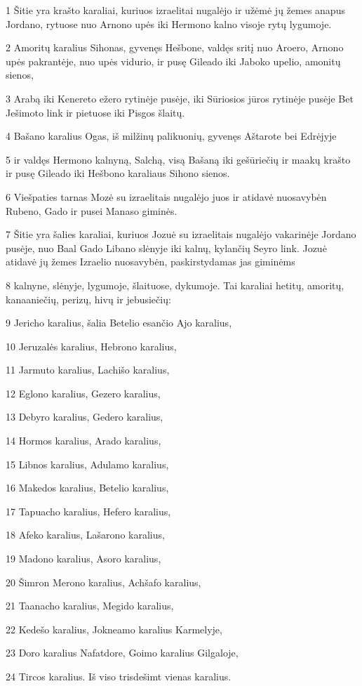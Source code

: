 \par 1 Šitie yra krašto karaliai, kuriuos izraelitai nugalėjo ir užėmė jų žemes anapus Jordano, rytuose nuo Arnono upės iki Hermono kalno visoje rytų lygumoje. 
\par 2 Amoritų karalius Sihonas, gyvenęs Hešbone, valdęs sritį nuo Aroero, Arnono upės pakrantėje, nuo upės vidurio, ir pusę Gileado iki Jaboko upelio, amonitų sienos, 
\par 3 Arabą iki Kenereto ežero rytinėje pusėje, iki Sūriosios jūros rytinėje pusėje Bet Ješimoto link ir pietuose iki Pisgos šlaitų. 
\par 4 Bašano karalius Ogas, iš milžinų palikuonių, gyvenęs Aštarote bei Edrėjyje 
\par 5 ir valdęs Hermono kalnyną, Salchą, visą Bašaną iki gešūriečių ir maakų krašto ir pusę Gileado iki Hešbono karaliaus Sihono sienos. 
\par 6 Viešpaties tarnas Mozė su izraelitais nugalėjo juos ir atidavė nuosavybėn Rubeno, Gado ir pusei Manaso giminės. 
\par 7 Šitie yra šalies karaliai, kuriuos Jozuė su izraelitais nugalėjo vakarinėje Jordano pusėje, nuo Baal Gado Libano slėnyje iki kalnų, kylančių Seyro link. Jozuė atidavė jų žemes Izraelio nuosavybėn, paskirstydamas jas giminėms 
\par 8 kalnyne, slėnyje, lygumoje, šlaituose, dykumoje. Tai karaliai hetitų, amoritų, kanaaniečių, perizų, hivų ir jebusiečių: 
\par 9 Jericho karalius, šalia Betelio esančio Ajo karalius, 
\par 10 Jeruzalės karalius, Hebrono karalius, 
\par 11 Jarmuto karalius, Lachišo karalius, 
\par 12 Eglono karalius, Gezero karalius, 
\par 13 Debyro karalius, Gedero karalius, 
\par 14 Hormos karalius, Arado karalius, 
\par 15 Libnos karalius, Adulamo karalius, 
\par 16 Makedos karalius, Betelio karalius, 
\par 17 Tapuacho karalius, Hefero karalius, 
\par 18 Afeko karalius, Lašarono karalius, 
\par 19 Madono karalius, Asoro karalius, 
\par 20 Šimron Merono karalius, Achšafo karalius, 
\par 21 Taanacho karalius, Megido karalius, 
\par 22 Kedešo karalius, Jokneamo karalius Karmelyje, 
\par 23 Doro karalius Nafatdore, Goimo karalius Gilgaloje, 
\par 24 Tircos karalius. Iš viso trisdešimt vienas karalius.



